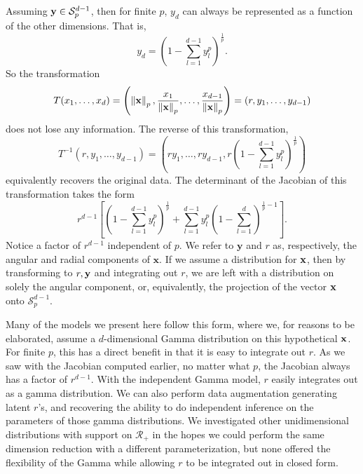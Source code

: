 Assuming ${\bf y} \in \mathcal{S}_{p}^{d-1}$, then for finite $p$, $y_d$ can always be represented as a
  function of the other dimensions.  That is,
  \begin{equation*}
    y_d = \left(1 - \sum_{l = 1}^{d-1}y_l^p\right)^{\frac{1}{p}}.
  \end{equation*}
  So the transformation
  \begin{equation*}
    T(x_1,\ldots,x_d) = \left(\left\lVert {\bf x} \right\rVert_{p}, \frac{x_1}{\left\lVert {\bf x} \right\rVert_{p}}, \ldots , \frac{x_{d-1}}{\left\lVert {\bf x} \right\rVert_{p}}\right) = (r,y_1,\ldots,y_{d-1})
  \end{equation*}
  does not lose any information.  The reverse of this transformation,
  \begin{equation*}
    T^{-1}\left(r,y_1,\ldots,y_{d-1}\right) =
      \left(ry_1,\ldots,ry_{d-1},r\left(1 - {\scriptstyle\sum}_{l = 1}^{d-1}y_l^p\right)^{\frac{1}{p}}\right)
  \end{equation*}
  equivalently recovers the original data.  The determinant of the Jacobian of this transformation
  takes the form
  \begin{equation*}
    r^{d-1}\left[\left(1 - \sum_{l = 1}^{d-1}y_l^p\right)^{\frac{1}{p}} +
        \sum_{l = 1}^{d-1}y_l^p\left(1 - \sum_{l=1}^d\right)^{\frac{1}{p} - 1}\right].
  \end{equation*}
  Notice a factor of $r^{d-1}$ independent of $p$. We refer to $\bm{y}$ and $r$ as, respectively,
  the angular and radial components of $\bm{x}$.  If we assume a distribution for ${\bf x}$, then
  by transforming to $r, {\bf y}$ and integrating out $r$, we are left with a distribution on solely
  the angular component, or, equivalently, the projection of the vector ${\bf x}$ onto
  $\mathcal{S}_{p}^{d-1}$.

Many of the models we present here follow this form, where we, for reasons to be elaborated, assume
  a $d$-dimensional Gamma distribution on this hypothetical ${\bf x}$. For finite $p$, this has a
  direct benefit in that it is easy to integrate out $r$.  As we saw with the Jacobian computed
  earlier, no matter what $p$, the Jacobian always has a factor of $r^{d-1}$.  With the independent
  Gamma model, $r$ easily integrates out as a gamma distribution.  We can also perform data
  augmentation generating latent $r$'s, and recovering the ability to do independent inference on
  the parameters of those gamma distributions.  We investigated other unidimensional distributions
  with support on $\mathcal{R}_+$ in the hopes we could perform the same dimension reduction with a
  different parameterization, but none offered the flexibility of the Gamma while allowing $r$ to be
  integrated out in closed form.

